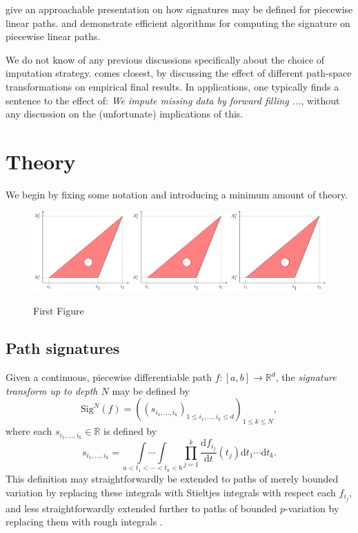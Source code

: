 \documentclass{article}
\newcommand{\reals}{\mathbb{R}}
\newcommand{\sig}{\mathrm{Sig}^N}
\begin{document}
\citet[Appendix A]{kidger2019deep} give an approachable presentation on how signatures may be defined for piecewise linear paths. \citet{iisignature} and \citet{signatory} demonstrate efficient algorithms for computing the signature on piecewise linear paths.%

We do not know of any previous discussions specifically about the choice of imputation strategy. \citet{fermanian2019embedding} comes closest, by discussing the effect of different path-space transformations on empirical final results. In applications, one typically finds a sentence to the effect of: \emph{We impute missing data by forward filling ...}, without any discussion on the (unfortunate) implications of this.

\section{Theory}
We begin by fixing some notation and introducing a minimum amount of theory.

\begin{figure}
	\includegraphics[width=\linewidth]{figures/sig_path.pdf}
	\label{fig:sig_path}
	\caption{First Figure}
\end{figure}

\subsection{Path signatures}
Given a continuous, piecewise differentiable path $f \colon [a, b] \to \reals^d$, the \emph{signature transform up to depth $N$} may be defined by
\begin{equation*}
    \sig(f)=\left(\left(s_{i_1, \ldots, i_k}\right)_{1 \leq i_{1}, \ldots, i_{k} \leq d}\right)_{1 \leq k \leq N},
\end{equation*}
where each $s_{i_1, \ldots, i_k} \in \reals$ is defined by
\begin{equation}\label{eq:signature}
    s_{i_1, \ldots, i_k} = \underset{\,a<t_{1}<\cdots<t_{k}<b}{\int \cdots \int} \prod_{j=1}^{k} \frac{\mathrm{d} f_{i_{j}}}{\mathrm{d} t}\left(t_{j}\right) \mathrm{d} t_{1} \cdots \mathrm{d} t_{k}.
\end{equation}
This definition may straightforwardly be extended to paths of merely bounded variation by replacing these integrals with Stieltjes integrals with respect each $f_{i_j}$, and less straightforwardly extended further to paths of bounded $p$-variation by replacing them with rough integrals \citep{lyons1998differential}.
\end{document}
